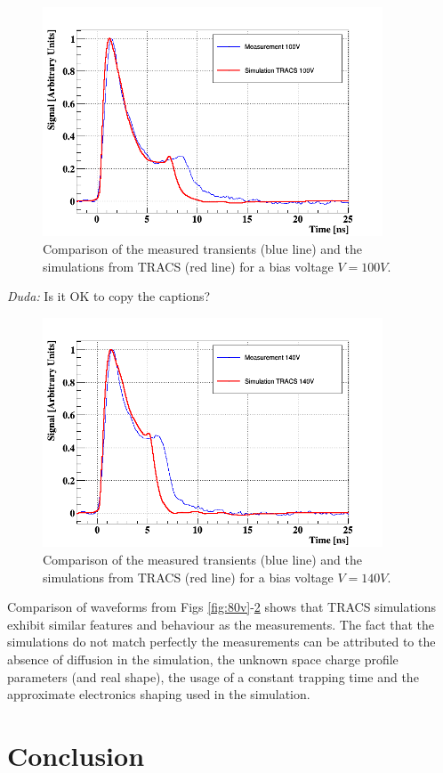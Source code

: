 \begin{figure}[H]
	\centering
	\includegraphics[width=0.9\textwidth]{100V.png}
	\caption{Comparison of the measured transients (blue line) and the simulations from TRACS (red line) for a bias voltage $V = 100V$.}
	\label{fig:100v}
\end{figure}

\emph{Duda: } Is it OK to copy the captions?

\begin{figure}[H]
	\centering
	\includegraphics[width=0.9\textwidth]{140V.png}
	\caption{Comparison of the measured transients (blue line) and the simulations from TRACS (red line) for a bias voltage $V = 140V$.}
	\label{fig:140v}
\end{figure}

Comparison of waveforms from Figs \ref{fig:80v}-\ref{fig:140v} shows that TRACS simulations exhibit similar features and behaviour as the measurements. The fact that the simulations do not match perfectly the measurements can be attributed to the absence of diffusion in the simulation, the unknown space charge profile parameters (and real shape), the usage of a constant trapping time and the approximate electronics shaping used in the simulation.

\section{Conclusion}